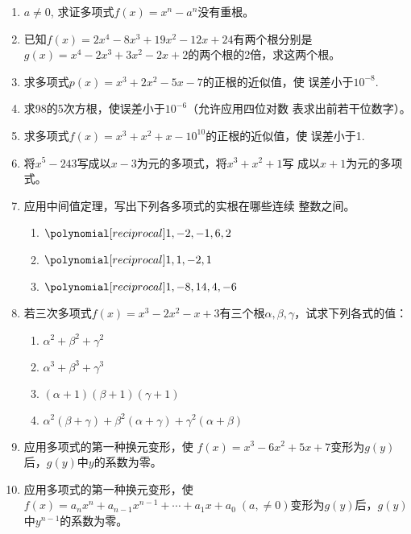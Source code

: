 \begin{enumerate}
\item $a\ne 0$, 求证多项式$f(x)=x^n-a^n$没有重根。

\item 已知$f(x)=2x^4-8x^3+19x^2-12x+24$有两个根分别是
$g(x)=x^4-2x^3+3x^2-2x+2$的两个根的2倍，求这两个根。

\item 求多项式$p(x)=x^3+2x^2-5x-7$的正根的近似值，使
误差小于$10^{-8}$.

\item 求98的5次方根，使误差小于$10^{-6}$（允许应用四位对数
表求出前若干位数字）。

\item 求多项式$f(x)=x^3+x^2+x-10^{10}$的正根的近似值，使
误差小于1.

\item 将$x^5-243$写成以$x-3$为元的多项式，将$x^3+x^2+1$写
成以$x+1$为元的多项式。

\item 应用中间值定理，写出下列各多项式的实根在哪些连续
整数之间。
\begin{enumerate}
    \item $\poly{1,-2,-1,6,2}$
    \item $\poly{1,1,-2,1}$
    \item $\poly{1,-8,14,4,-6}$
\end{enumerate}

\item 若三次多项式$f(x)=x^3-2x^2-x+3$有三个根$\alpha,\beta,\gamma$，试求下列各式的值：
\begin{enumerate}
    \item $\alpha^2+\beta^2+\gamma^2$
    \item $\alpha^3+\beta^3+\gamma^3$
    \item $(\alpha+1)(\beta+1)(\gamma+1)$
    \item $\alpha^2(\beta+\gamma)+\beta^2(\alpha+\gamma)+\gamma^2(\alpha+\beta)$
\end{enumerate}


\item 应用多项式的第一种换元变形，使
$f (x) =x^3-6x^2+5x+7$变形为$g(y)$后，$g(y)$中$y$的系数为零。
\item 应用多项式的第一种换元变形，使
$f (x) =a_nx^n+a_{n-1}x^{n-1}+\cdots +a_1x+a_0\;  (a, \ne 0)$变形为$g(y)$后，$g(y)$中$y^{n-1}$的系数为零。


\end{enumerate}
